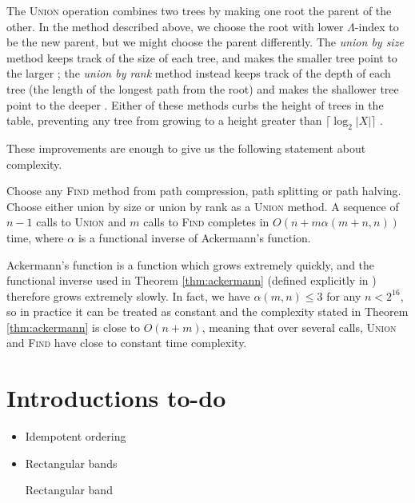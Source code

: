 The \textsc{Union} operation combines two trees by making one root the parent of
the other.  In the method described above, we choose the root with lower $\Lambda$-index
to be the new parent, but we might choose the parent differently.  The
\textit{union by size} method keeps track of the size of each tree, and makes
the smaller tree point to the larger \cite{galil_1991}; the \textit{union by
  rank} method instead keeps track of the depth of each tree (the length of the
longest path from the root) and makes the shallower tree point to the deeper
\cite{tarjan_1984}.  Either of these methods curbs the height of trees in the
table, preventing any tree from growing to a height greater than
$\lceil\log_2 |X|\rceil$ \cite[Lemma 1.1.2]{galil_1991}.

These improvements are enough to give us the following statement about
complexity.

\begin{theorem}
  \label{thm:ackermann}
  Choose any \textsc{Find} method from path compression, path splitting or path
  halving.  Choose either union by size or union by rank as a \textsc{Union}
  method.  A sequence of $n-1$ calls to \textsc{Union} and $m$ calls to
  \textsc{Find} completes in $O(n + m\alpha(m+n, n))$ time, where $\alpha$ is
  a functional inverse of Ackermann's function.
\end{theorem}

Ackermann's function is a function which grows extremely quickly, and the
functional inverse used in Theorem \ref{thm:ackermann} (defined explicitly in
\cite{tarjan_1984}) therefore grows extremely slowly.  In fact, we have
$\alpha(m,n) \leq 3$ for any $n < 2^{16}$, so in practice it can be treated as
constant and the complexity stated in Theorem \ref{thm:ackermann} is close to
$O(n + m)$, meaning that over several calls, \textsc{Union} and \textsc{Find}
have close to constant time complexity.

\section{Introductions to-do}
\begin{itemize}
\item Idempotent ordering
\item Rectangular bands
  \begin{definition}\label{def:rectangular-band}Rectangular band\end{definition}
\end{itemize}

